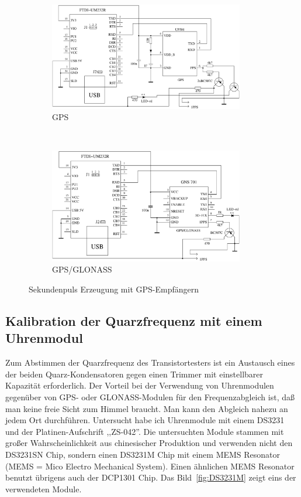 \begin{figure}[H]
  \begin{subfigure}[b]{9cm}
    \centering
    \includegraphics[width=8.5cm]{../FIG/GPS_UP501.pdf}
    \caption{GPS}
  \end{subfigure}
  ~
  \begin{subfigure}[b]{9cm}
    \centering
    \includegraphics[width=8.5cm]{../FIG/GPS_GNS701.pdf}
    \caption{GPS/GLONASS}
  \end{subfigure}
  \caption{Sekundenpuls Erzeugung mit GPS-Empfängern }
  \label{fig:GPS-1PPS}
\end{figure}

\subsection{Kalibration der Quarzfrequenz mit einem Uhrenmodul}

Zum Abstimmen der Quarzfrequenz des Transistortesters ist ein Austausch eines der beiden Quarz-Kondensatoren 
gegen einen Trimmer mit einstellbarer Kapazität erforderlich.
Der Vorteil bei der Verwendung von Uhrenmodulen gegenüber von GPS- oder GLONASS-Modulen für den Frequenzabgleich ist,
daß man keine freie Sicht zum Himmel braucht. Man kann den Abgleich nahezu an jedem Ort durchführen.
Untersucht habe ich Uhrenmodule mit einem DS3231 und der Platinen-Aufschrift ,,ZS-042''.
Die untersuchten Module stammen mit großer Wahrscheinlichkeit aus chinesischer Produktion und verwenden
nicht den DS3231SN Chip, sondern einen DS3231M Chip mit einem MEMS Resonator (MEMS = Mico Electro Mechanical System). 
Einen ähnlichen MEMS Resonator benutzt übrigens auch der DCP1301 Chip.
Das Bild~\ref{fig:DS3231M} zeigt eins der verwendeten Module.

